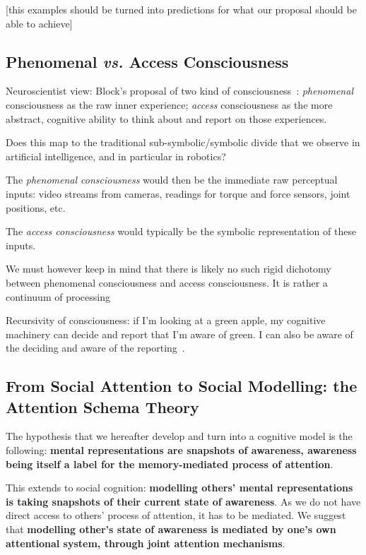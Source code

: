 \documentclass[a4paper]{article}
\newcommand{\vs}{\textit{vs.}\xspace}
\begin{document}
[this examples should be turned into predictions for what our proposal should be
able to achieve]



\subsection{Phenomenal \vs Access Consciousness}

Neuroscientist view: Block's proposal of two kind of consciousness~\cite{block1996can}:
\emph{phenomenal} consciousness as the raw inner experience; \emph{access}
consciousness as the more abstract, cognitive ability to think about and report
on those experiences.

Does this map to the traditional sub-symbolic/symbolic divide that we observe in
artificial intelligence, and in particular in robotics?

The \emph{phenomenal consciousness} would then be the immediate raw perceptual
inputs: video streams from cameras, readings for torque and force sensors, joint
positions, etc.

The \emph{access consciousness} would typically be the symbolic representation
of these inputs.


We must however keep in mind that there is likely no such rigid dichotomy
between phenomenal consciousness and access consciousness. It is rather a
continuum of processing~\citep[p.55]{graziano2013consciousness}

Recursivity of consciousness: if I'm looking at a green apple, my cognitive
machinery can decide and report that I'm aware of green. I can also be aware of
the deciding and aware of the reporting~\citep[p.55]{graziano2013consciousness}.

\subsection{From Social Attention to Social Modelling: the Attention Schema Theory}

The hypothesis that we hereafter develop and turn into a cognitive model is the
following: \textbf{mental representations are snapshots of awareness, awareness being
itself a label for the memory-mediated process of attention}.

This extends to social cognition: \textbf{modelling others' mental representations is
taking snapshots of their current state of awareness}. As we do not have direct
access to others' process of attention, it has to be mediated. We suggest that
\textbf{modelling other's state of awareness is mediated by one's own
attentional system, through joint attention mechanisms}.
\end{document}
